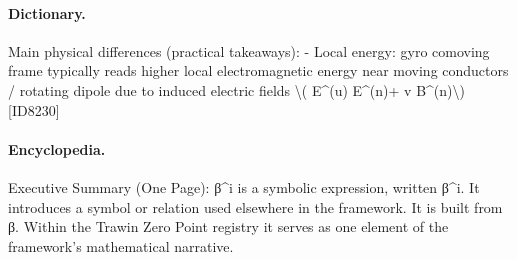 \paragraph{Dictionary.}
Main physical differences (practical takeaways): - Local energy: gyro comoving frame typically reads higher local electromagnetic energy near moving conductors / rotating dipole due to induced electric fields \textbackslash{}( E\textasciicircum{}(u) E\textasciicircum{}(n)+ v B\textasciicircum{}(n)\textbackslash{}) [ID8230]

\paragraph{Encyclopedia.}
Executive Summary (One Page): β\textasciicircum{}i is a symbolic expression, written β\textasciicircum{}i. It introduces a symbol or relation used elsewhere in the framework. It is built from β. Within the Trawin Zero Point registry it serves as one element of the framework's mathematical narrative.
